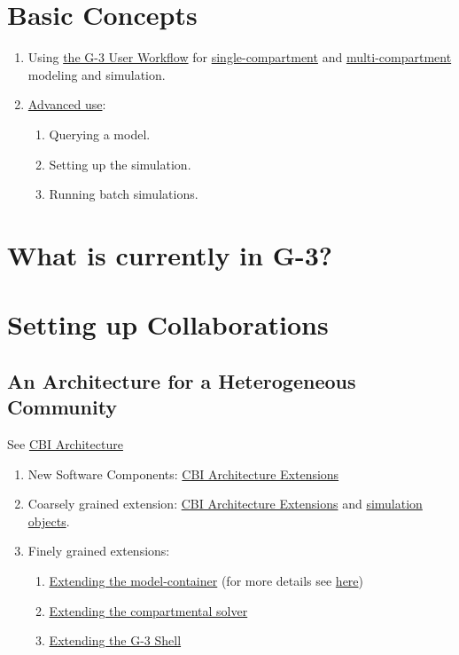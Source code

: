 \documentclass[12pt]{article}
\begin{document}
\section{Basic Concepts}

\begin{enumerate}
\item Using \href{../workflow-user/workflow-user.tex}{the G-3 User
    Workflow} for
  \href{../tutorial1/tutorial1.tex}{single-compartment} and
  \href{../tutorial2/tutorial2.tex}{multi-compartment} modeling and
  simulation.
\item \href{../tutorial3/tutorial3.tex}{Advanced use}:
  \begin{enumerate}
  \item Querying a model.
  \item Setting up the simulation.
  \item Running batch simulations.
  \end{enumerate}
\end{enumerate}

\section{What is currently in G-3?}


\section{Setting up Collaborations}

\subsection{An Architecture for a Heterogeneous Community}

See \href{../genesis-overview/genesis-overview.tex}{CBI Architecture}

\begin{enumerate}
\item New Software Components:
  \href{../genesis-addto-component-developerpackage/genesis-addto-component-developerpackage.tex}{CBI
    Architecture Extensions}
\item Coarsely grained extension:
  \href{../genesis-add-feature-ssp/genesis-add-feature-ssp.tex}{CBI
    Architecture Extensions} and
  \href{../genesis-add-object-solver/genesis-add-object-solver.tex}{simulation
    objects}.
\item Finely grained extensions:
  \begin{enumerate}
  \item
    \href{../genesis-extend-model-container/genesis-extend-model-container.tex}{Extending
      the model-container} (for more details see
    \href{../genesis-extend-model-container-detail/genesis-extend-model-container-detail.tex}{here})
  \item
    \href{../genesis-add-object-solver/genesis-add-object-solver.tex}{Extending the compartmental solver}
  \item \href{../genesis-add-object-solver/genesis-add-object-solver.tex}{Extending the G-3 Shell}
  \end{enumerate}
\end{enumerate}
\end{document}
